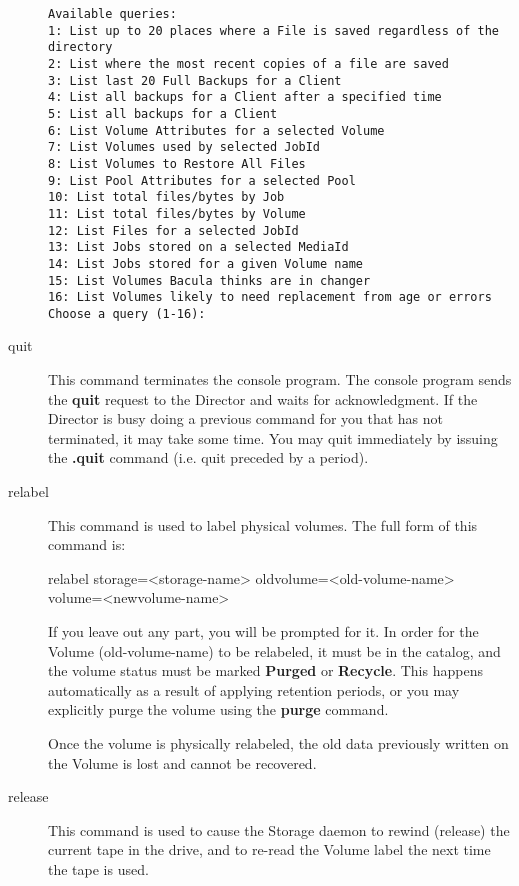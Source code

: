 \begin{description}
\footnotesize
\begin{verbatim}
Available queries:
1: List up to 20 places where a File is saved regardless of the directory
2: List where the most recent copies of a file are saved
3: List last 20 Full Backups for a Client
4: List all backups for a Client after a specified time
5: List all backups for a Client
6: List Volume Attributes for a selected Volume
7: List Volumes used by selected JobId
8: List Volumes to Restore All Files
9: List Pool Attributes for a selected Pool
10: List total files/bytes by Job
11: List total files/bytes by Volume
12: List Files for a selected JobId
13: List Jobs stored on a selected MediaId
14: List Jobs stored for a given Volume name
15: List Volumes Bacula thinks are in changer
16: List Volumes likely to need replacement from age or errors
Choose a query (1-16):
\end{verbatim}
\normalsize

\item [quit]
   This command terminates the console program. The  console program sends the
   {\bf quit} request to the Director  and waits for acknowledgment. If the
   Director is busy doing  a previous command for you that has not terminated, it
   may  take some time. You may quit immediately by issuing the  {\bf .quit}
   command (i.e. quit preceded by a period).

\item [relabel]
   This command is used to label physical volumes.  The full form of this
   command is:

relabel storage={\textless}storage-name{\textgreater} oldvolume={\textless}old-volume-name{\textgreater}
    volume={\textless}newvolume-name{\textgreater}

   If you leave out any part, you will be prompted for it.  In order for
   the Volume (old-volume-name) to be relabeled, it must be in the catalog,
   and the volume status must be marked {\bf Purged} or {\bf Recycle}.
   This happens automatically as a result of applying retention periods, or
   you may explicitly purge the volume using the {\bf purge} command.

   Once the volume is physically relabeled, the old data previously written
   on the Volume is lost and cannot be recovered.

\item [release]
   This command is used to cause the Storage daemon to rewind (release) the
   current tape in the drive, and to re-read the Volume label the next time
   the tape is used.


\end{description}
